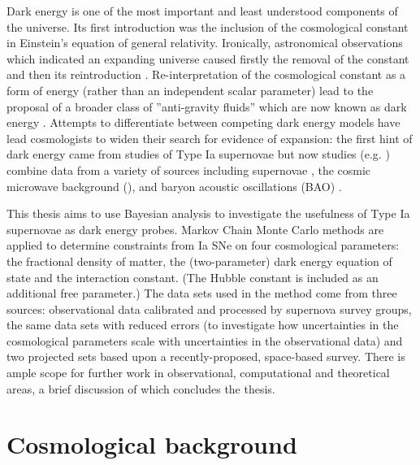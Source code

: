 
Dark energy is one of the most important and least understood components of the universe. Its first introduction was the inclusion of the cosmological constant in Einstein’s equation of general relativity. Ironically, astronomical observations which indicated an expanding universe caused firstly the removal of the constant \cite{Harrison1993} and then its reintroduction \cite{Hobson2006}. Re-interpretation of the cosmological constant as a form of energy (rather than an independent scalar parameter) lead to the proposal of a broader class of ”anti-gravity fluids” which are now known as dark energy \cite{Hobson2006}. Attempts to differentiate between competing dark energy models have lead cosmologists to widen their search for evidence of expansion: the first hint of dark energy came from studies of Type Ia supernovae \cite{Leibundgut2008} but now studies (e.g. \cite{Amanullah2010,LewisBridle2002}) combine data from a variety of sources including supernovae \cite{Hicken2009,Riess2007,Kowalski2008}, the cosmic microwave background (\cmb{}), \cite{LewisBridle2002} and baryon acoustic oscillations (BAO) \cite{Komatsu2010}. 

This thesis aims to use Bayesian analysis to investigate the usefulness of Type Ia supernovae as dark energy probes. Markov Chain Monte Carlo methods are applied to determine constraints from Ia SNe on four cosmological parameters: the fractional density of matter, the (two-parameter) dark energy equation of state and the interaction constant. (The Hubble constant is included as an additional free parameter.) The data sets used in the \mcmc{} method come from three sources: observational data calibrated and processed by supernova survey groups, the same data sets with reduced errors (to investigate how uncertainties in the cosmological parameters scale with uncertainties in the observational data) and two projected sets based upon a recently-proposed, space-based survey. There is ample scope for further work in observational, computational and theoretical areas, a brief discussion of which concludes the thesis.

\section{Cosmological background}
\label{sec:cosmological-background}


